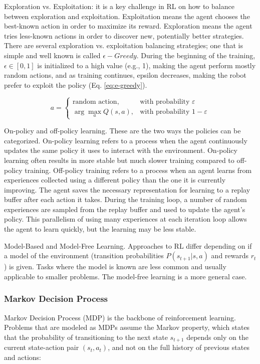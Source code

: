 \bigskip \noindent
Exploration vs. Exploitation: it is a key challenge in RL on how to balance between exploration and exploitation. Exploitation means the agent chooses the best-known action in order to maximize its reward. Exploration means the agent tries less-known actions in order to discover new, potentially better strategies. There are several exploration vs. exploitation balancing strategies; one that is simple and well known is called $\epsilon - Greedy$. During the beginning of the training, $\epsilon \in [0,1]$ is initialized to a high value (e.g., 1), making the agent perform mostly random actions, and as training continues, epsilon decreases, making the robot prefer to exploit the policy (Eq. \ref{eq:e-greedy}).

\begin{equation}
a =
\begin{cases} 
\text{random action}, & \text{with probability } \varepsilon \\
\arg\max_{a} Q(s, a), & \text{with probability } 1 - \varepsilon
\end{cases}
\label{eq:e-greedy}
\end{equation}

\bigskip \noindent
On-policy and off-policy learning. These are the two ways the policies can be categorized. On-policy learning refers to a process when the agent continuously updates the same policy it uses to interact with the environment. On-policy learning often results in more stable but much slower training compared to off-policy training. Off-policy training refers to a process when an agent learns from experiences collected using a different policy than the one it is currently improving. The agent saves the necessary representation for learning to a replay buffer after each action it takes. During the training loop, a number of random experiences are sampled from the replay buffer and used to update the agent's policy. This parallelism of using many experiences at each iteration loop allows the agent to learn quickly, but the learning may be less stable.

\bigskip \noindent
Model-Based and Model-Free Learning. Approaches to RL differ depending on if a model of the environment (transition probabilities $ P(s_{t+1} | s, a)$ and rewards $r_t$) is given. Tasks where the model is known are less common and usually applicable to smaller problems. The model-free learning is a more general case.

\subsubsection{Markov Decision Process}
Markov Decision Process (MDP) is the backbone of reinforcement learning. Problems that are modeled as MDPs assume the Markov property, which states that the probability of transitioning to the next state \( s_{t+1} \) depends only on the current state-action pair \( (s_t, a_t) \), and not on the full history of previous states and actions:

